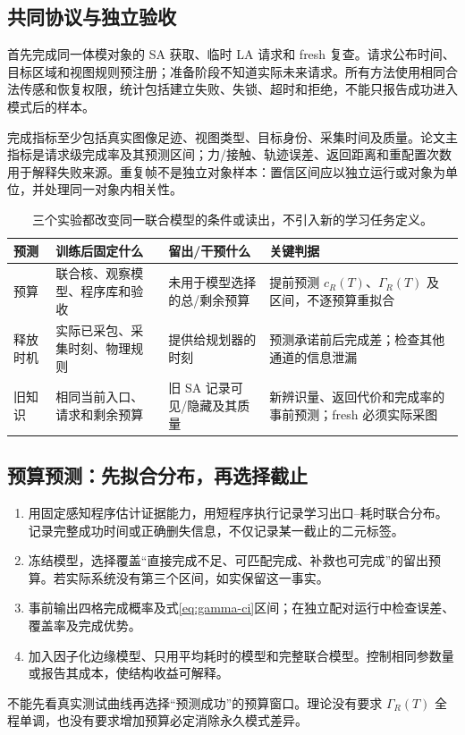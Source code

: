 \documentclass[11pt,a4paper,fontset=fandol]{ctexart}
\theoremstyle{definition}
\theoremstyle{remark}
\numberwithin{equation}{section}
\begin{document}
\subsection{共同协议与独立验收}
首先完成同一体模对象的 SA 获取、临时 LA 请求和 fresh 复查。请求公布时间、目标区域和视图规则预注册；准备阶段不知道实际未来请求。所有方法使用相同合法传感和恢复权限，统计包括建立失败、失锁、超时和拒绝，不能只报告成功进入模式后的样本。

完成指标至少包括真实图像足迹、视图类型、目标身份、采集时间及质量。论文主指标是请求级完成率及其预测区间；力/接触、轨迹误差、返回距离和重配置次数用于解释失败来源。重复帧不是独立对象样本：置信区间应以独立运行或对象为单位，并处理同一对象内相关性。

\begin{table}[htbp]\centering\small
\begin{tabularx}{\linewidth}{P{.14\linewidth}YYY}
\toprule
预测 & 训练后固定什么 & 留出/干预什么 & 关键判据\\\midrule
预算 & 联合核、观察模型、程序库和验收 & 未用于模型选择的总/剩余预算 & 提前预测 $c_R(T)$、$\Gamma_R(T)$ 及区间，不逐预算重拟合\\
释放时机 & 实际已采包、采集时刻、物理规则 & 提供给规划器的时刻 & 预测承诺前后完成差；检查其他通道的信息泄漏\\
旧知识 & 相同当前入口、请求和剩余预算 & 旧 SA 记录可见/隐藏及其质量 & 新辨识量、返回代价和完成率的事前预测；fresh 必须实际采图\\
\bottomrule
\end{tabularx}
\caption{三个实验都改变同一联合模型的条件或读出，不引入新的学习任务定义。}
\end{table}

\subsection{预算预测：先拟合分布，再选择截止}
\begin{enumerate}
\item 用固定感知程序估计证据能力，用短程序执行记录学习出口--耗时联合分布。记录完整成功时间或正确删失信息，不仅记录某一截止的二元标签。
\item 冻结模型，选择覆盖“直接完成不足、可匹配完成、补救也可完成”的留出预算。若实际系统没有第三个区间，如实保留这一事实。
\item 事前输出四格完成概率及式\eqref{eq:gamma-ci}区间；在独立配对运行中检查误差、覆盖率及完成优势。
\item 加入因子化边缘模型、只用平均耗时的模型和完整联合模型。控制相同参数量或报告其成本，使结构收益可解释。
\end{enumerate}
不能先看真实测试曲线再选择“预测成功”的预算窗口。理论没有要求 $\Gamma_R(T)$ 全程单调，也没有要求增加预算必定消除永久模式差异。
\end{document}
